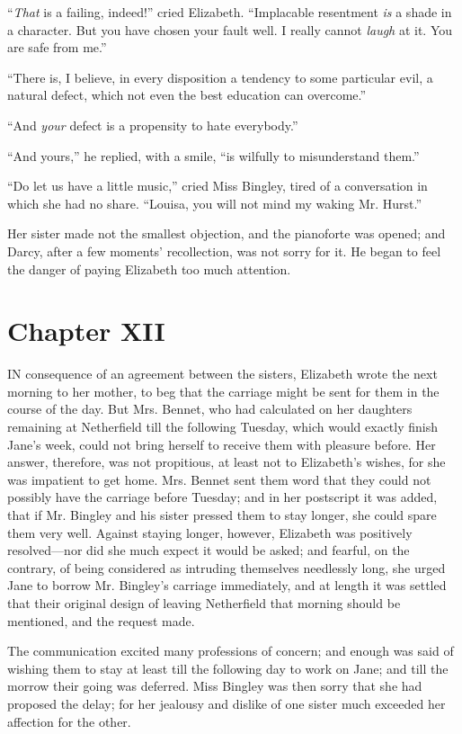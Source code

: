 \documentclass[12pt,openright]{book}
\begin{document}
“\textit{That} is a failing, indeed!” cried Elizabeth. “Implacable resentment \textit{is} a shade in a character. But you have chosen your fault well. I really cannot \textit{laugh} at it. You are safe from me.”

“There is, I believe, in every disposition a tendency to some particular evil, a natural defect, which not even the best education can overcome.”

“And \textit{your} defect is a propensity to hate everybody.”

“And yours,” he replied, with a smile, “is wilfully to misunderstand them.”

“Do let us have a little music,” cried Miss Bingley, tired of a conversation in which she had no share. “Louisa, you will not mind my waking Mr. Hurst.”

Her sister made not the smallest objection, and the pianoforte was opened; and Darcy, after a few moments’ recollection, was not sorry for it. He began to feel the danger of paying Elizabeth too much attention.

\chapter{Chapter XII}

\noindent  IN consequence of an agreement between the sisters, Elizabeth wrote the next morning to her mother, to beg that the carriage might be sent for them in the course of the day. But Mrs. Bennet, who had calculated on her daughters remaining at Netherfield till the following Tuesday, which would exactly finish Jane’s week, could not bring herself to receive them with pleasure before. Her answer, therefore, was not propitious, at least not to Elizabeth’s wishes, for she was impatient to get home. Mrs. Bennet sent them word that they could not possibly have the carriage before Tuesday; and in her postscript it was added, that if Mr. Bingley and his sister pressed them to stay longer, she could spare them very well. Against staying longer, however, Elizabeth was positively resolved—nor did she much expect it would be asked; and fearful, on the contrary, of being considered as intruding themselves needlessly long, she urged Jane to borrow Mr. Bingley’s carriage immediately, and at length it was settled that their original design of leaving Netherfield that morning should be mentioned, and the request made.

The communication excited many professions of concern; and enough was said of wishing them to stay at least till the following day to work on Jane; and till the morrow their going was deferred. Miss Bingley was then sorry that she had proposed the delay; for her jealousy and dislike of one sister much exceeded her affection for the other.
\end{document}
